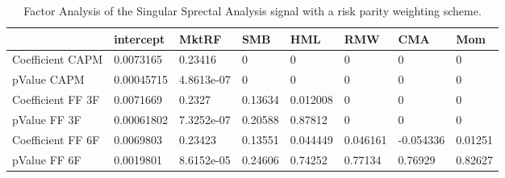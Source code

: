 \begin{table}[H]
\centering
\begin{tabular}{llllllll}
& intercept & MktRF & SMB & HML & RMW & CMA & Mom \\ 
\hline 
Coefficient CAPM & 0.0073165 & 0.23416 & 0 & 0 & 0 & 0 & 0 \\ 
pValue CAPM & 0.00045715 & 4.8613e-07 & 0 & 0 & 0 & 0 & 0 \\ 
Coefficient FF 3F & 0.0071669 & 0.2327 & 0.13634 & 0.012008 & 0 & 0 & 0 \\ 
pValue FF 3F & 0.00061802 & 7.3252e-07 & 0.20588 & 0.87812 & 0 & 0 & 0 \\ 
Coefficient FF 6F & 0.0069803 & 0.23423 & 0.13551 & 0.044449 & 0.046161 & -0.054336 & 0.01251 \\ 
pValue FF 6F & 0.0019801 & 8.6152e-05 & 0.24606 & 0.74252 & 0.77134 & 0.76929 & 0.82627 \\ 
\hline
\end{tabular}
\caption{Factor Analysis of the Singular Sprectal Analysis signal with a risk parity weighting scheme.}
\label{SSA_RP_FACTOR}
\end{table}